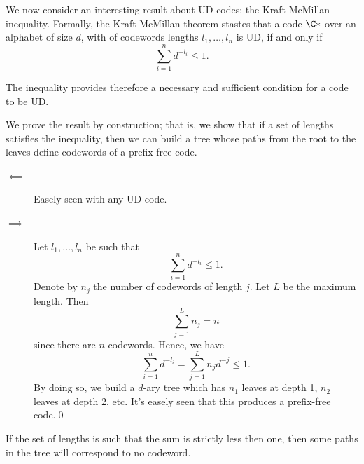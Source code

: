\documentclass{subfiles}
\begin{document}
    We now consider an interesting result about UD codes: the Kraft-McMillan inequality.
        Formally, the Kraft-McMillan theorem stastes that a code \(\C*\) over an alphabet 
        of size \(d\), with of codewords lengths \(l_{1}, \ldots, l_{n}\) is UD, if and only if 
        \[
            \sum_{i = 1}^{n}d^{-l_{i}} \le 1.
        \]

    The inequality provides therefore a necessary and sufficient condition for a
        code to be UD. 

    \begin{proof*}
        We prove the result by construction; that is, 
            we show that if a set of lengths satisfies the inequality,
            then we can build a tree whose paths from the root to the leaves 
            define codewords of a prefix-free code.

        \begin{description}
            \item [\(\impliedby\)] Easely seen with any UD code.
            \item [\(\implies\)] Let \(l_{1}, \ldots, l_{n}\) be such that 
                \[
                    \sum_{i = 1}^{n} d^{-l_{i}} \le 1.
                \]
                Denote by \(n_{j}\) the number of codewords of length \(j\).
                Let \(L\) be the maximum length.
                Then 
                \[
                    \sum_{j = 1}^{L} n_{j} = n
                \]
                since there are \(n\) codewords. Hence, we have 
                \[
                    \sum_{i = 1}^{n} d^{-l_{i}} = \sum_{j = 1}^{L} n_{j}d^{-j} \le 1.
                \]
                By doing so, we build a \(d\)-ary tree which has \(n_{1}\) 
                leaves at depth 1, \(n_{2}\) leaves at depth 2, etc.
                It's easely seen that this produces a prefix-free code.\qed
        \end{description}
    \end{proof*}

    \begin{remark*}
        If the set of lengths is such that the sum is strictly less then one,
            then some paths in the tree will correspond to no codeword.
    \end{remark*}
\end{document}
